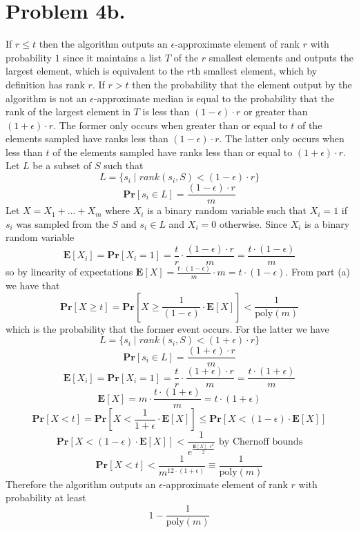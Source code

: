 \documentclass[12pt]{article}
\begin{document}
\section*{Problem 4b.}
If $r \le t$ then the algorithm outputs an $\epsilon$-approximate element of
rank $r$ with probability $1$ since it maintains a list $T$ of the $r$ smallest
elements and outputs the largest element, which is equivalent to the
$r$th smallest element, which by definition has rank $r$. If $r > t$ then the
probability that the element output by the algorithm is not an
$\epsilon$-approximate median is equal to the probability that the rank of
the largest element in $T$ is less than $(1-\epsilon)\cdot r$ or greater than
$(1+\epsilon)\cdot r$. The former only occurs when greater than or equal to
$t$ of the elements sampled have ranks less than $(1-\epsilon)\cdot r$. The
latter only occurs when less than $t$ of the elements sampled have ranks less
than or equal to $(1+\epsilon)\cdot r$. Let $L$ be a subset of $S$ such that
$$L = \{s_i \mid rank(s_i, S) < (1-\epsilon)\cdot r\}$$
$$\textbf{Pr}[s_i \in L] = \frac{(1-\epsilon)\cdot r}{m}$$
Let $X = X_1 + ... + X_m$ where $X_i$ is a binary random variable such
that $X_i = 1$ if $s_i$ was sampled from the $S$ and $s_i \in L$ and
$X_i = 0$ otherwise. Since $X_i$ is a binary random variable
$$\textbf{E}[X_i] = \textbf{Pr}[X_i = 1] = \frac{t}{r}\cdot
\frac{(1-\epsilon)\cdot r}{m} = \frac{t\cdot (1-\epsilon)}{m}$$
so by linearity of expectations $\textbf{E}[X] =
\frac{t\cdot (1-\epsilon)}{m}\cdot m = t\cdot(1-\epsilon)$. From part (a) we
have that
$$\textbf{Pr}[X \ge t] =
\textbf{Pr}[X \ge \frac{1}{(1-\epsilon)}\cdot \textbf{E}[X]] <
\frac{1}{\text{poly}(m)}$$
which is the probability that the former event occurs. For the latter we have
$$L = \{s_i \mid rank(s_i, S) < (1+\epsilon)\cdot r\}$$
$$\textbf{Pr}[s_i \in L] = \frac{(1+\epsilon)\cdot r}{m}$$
$$\textbf{E}[X_i] = \textbf{Pr}[X_i = 1] = \frac{t}{r}\cdot
\frac{(1+\epsilon)\cdot r}{m} = \frac{t\cdot(1+\epsilon)}{m}$$
$$\textbf{E}[X] = m\cdot \frac{t\cdot(1+\epsilon)}{m}= t\cdot (1+\epsilon)$$
$$\textbf{Pr}[X < t] =
\textbf{Pr}[X < \frac{1}{1+\epsilon}\cdot\textbf{E}[X]] \le
\textbf{Pr}[X < (1-\epsilon)\cdot\textbf{E}[X]]$$
$$\textbf{Pr}[X < (1-\epsilon)\cdot\textbf{E}[X]] <
\frac{1}{e^{\frac{\textbf{E}[X]\cdot\epsilon^2}{2}}}
\text{ by Chernoff bounds}$$
$$\textbf{Pr}[X < t] < \frac{1}{m^{12\cdot(1+\epsilon)}} \equiv
\frac{1}{\text{poly}(m)}$$
Therefore the algorithm outputs an $\epsilon$-approximate element of rank $r$
with probability at least
$$1-\frac{1}{\text{poly}(m)}$$
\end{document}
